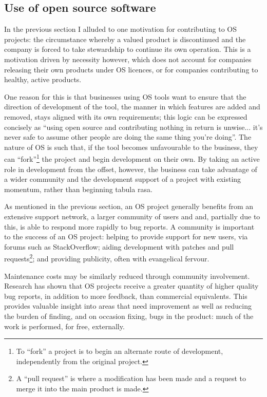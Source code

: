 \documentclass[a4paper]{article}
\begin{document}
\subsection{Use of open source software}

In the previous section I alluded to one motivation for contributing to OS projects: the circumstance whereby a valued product is discontinued and the company is forced to take stewardship to continue its own operation. This is a motivation driven by necessity however, which does not account for companies releasing their own products under OS licences, or for companies contributing to healthy, active products.

One reason for this is that businesses using OS tools want to ensure that the direction of development of the tool, the manner in which features are added and removed, stays aligned with its own requirements; this logic can be expressed concisely as “using open source and contributing nothing in return is unwise... it’s never safe to assume other people are doing the same thing you’re doing”\cite{feedfish}. The nature of OS is such that, if the tool becomes unfavourable to the business, they can “fork”\footnote{To “fork” a project is to begin an alternate route of development, independently from the original project.} the project and begin development on their own. By taking an active role in development from the offset, however, the business can take advantage of a wider community and the development support of a project with existing momentum, rather than beginning tabula rasa.

As mentioned in the previous section, an OS project generally benefits from an extensive support network, a larger community of users and and, partially due to this, is able to respond more rapidly to bug reports. A community is important to the success of an OS project: helping to provide support for new users, via forums such as StackOverflow\cite{stackoverflow}; aiding development with patches and pull requests\footnote{A “pull request” is where a modification has been made and a request to merge it into the main product is made.}; and providing publicity, often with evangelical fervour\cite{whyemacs}. 

Maintenance costs may be similarly reduced through community involvement. Research has shown that OS projects receive a greater quantity of higher quality bug reports, in addition to more feedback, than commercial equivalents\cite{cio}. This provides valuable insight into areas that need improvement as well as reducing the burden of finding, and on occasion fixing, bugs in the product: much of the work is performed, for free, externally.
\end{document}

